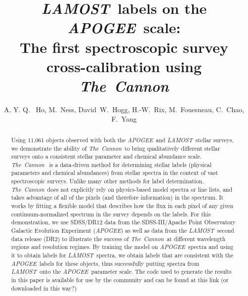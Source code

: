 \documentclass[12pt, preprint]{aastex}
\newcommand{\tc}{\textsl{The~Cannon}}
\newcommand{\apogee}{\textsl{APOGEE}}
\newcommand{\lamost}{\textsl{LAMOST}}
\begin{document}
\title{\lamost\ labels on the \apogee\ scale: \\ The first spectroscopic survey cross-calibration using \tc}
\author{A. Y. Q. ~Ho,
M.~Ness,
David~W.~Hogg, 
H.-W.~Rix,
M.~Fouesneau,
C.~Chao,
F.~Yang
}


\begin{abstract}

Using 11,061 objects observed with both the \apogee\ and \lamost\ stellar
surveys, we demonstrate the ability of \tc\ to bring qualitatively 
different stellar surveys onto a consistent stellar parameter and chemical 
abundance scale. 
\tc\ \citep{ness2015} is a data-driven method for determining stellar labels 
(physical parameters and chemical abundances) from stellar spectra in the 
context of vast spectroscopic surveys. 
Unlike many other methods for label determination, \tc\ does not 
explicitly rely on physics-based model spectra or line lists, and takes 
advantage of all of the pixels (and therefore information) in the spectrum. 
It works by fitting a flexible model that describes how the flux in each 
pixel of any given continuum-normalized spectrum in the survey depends on 
the labels. 
For this demonstration, we use SDSS/DR12 data from the 
SDSS-III/Apache Point Observatory Galactic Evolution Experiment (\apogee) 
as well as data from the \lamost\ second data release (DR2) to illustrate the 
success of \tc\ at different wavelength regions and resolution regimes. 
By training the model on \apogee\ spectra and using it to obtain labels for 
\lamost\ spectra, we obtain labels that are consistent
with the \apogee\ labels for these objects, thus successfully putting spectra
from \lamost\ onto the \apogee\ parameter scale. 
The code used to generate the results in this paper is available for use by
the community and can be found at this link (or downloaded in this way?)

\end{abstract}
\end{document}
